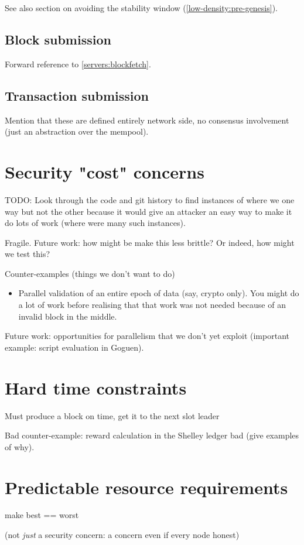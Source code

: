 See also section on avoiding the stability window
(\cref{low-density:pre-genesis}).

\subsection{Block submission}
\label{nonfunctional:network:blocksubmission}

Forward reference to \cref{servers:blockfetch}.

\subsection{Transaction submission}
\label{nonfunctional:network:txsubmission}

Mention that these are defined entirely network side, no consensus involvement
(just an abstraction over the mempool).

\section{Security "cost" concerns}

TODO: Look through the code and git history to find instances of where we
one way but not the other because it would give an attacker an easy way to
make it do lots of work (where were many such instances).

Fragile. Future work: how might be make this less brittle?
Or indeed, how might we test this?

Counter-examples (things we don't want to do)

\begin{itemize}
\item Parallel validation of an entire epoch of data (say, crypto only).
You might do a lot of work before realising that that work was not needed because
of an invalid block in the middle.
\end{itemize}

Future work: opportunities for parallelism that we don't yet exploit
(important example: script evaluation in Goguen).

\section{Hard time constraints}

Must produce a block on time, get it to the next slot leader

Bad counter-example: reward calculation in the Shelley ledger bad
(give examples of why).

\section{Predictable resource requirements}

make best == worst

(not \emph{just} a security concern: a concern even if every node honest)

